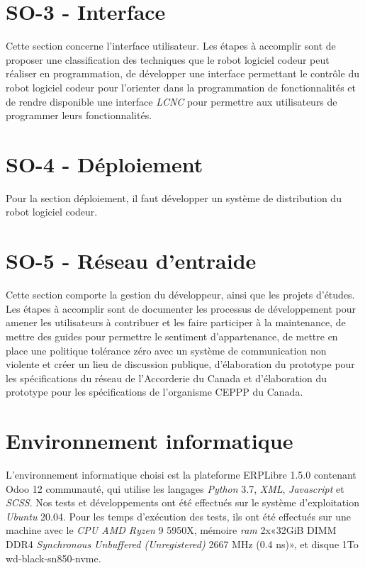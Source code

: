 \section{SO-3 - Interface}
Cette section concerne l'interface utilisateur. Les étapes à accomplir sont de proposer une classification des techniques que le robot logiciel codeur peut réaliser en programmation, de développer une interface permettant le contrôle du robot logiciel codeur pour l’orienter dans la programmation de fonctionnalités et de rendre disponible une interface \textit{LCNC} pour permettre aux utilisateurs de programmer leurs fonctionnalités.

\section{SO-4 - Déploiement}
Pour la section déploiement, il faut développer un système de distribution du robot logiciel codeur.

\section{SO-5 - Réseau d’entraide}
Cette section comporte la gestion du développeur, ainsi que les projets d'études. Les étapes à accomplir sont de documenter les processus de développement pour amener les utilisateurs à contribuer et les faire participer à la maintenance, de mettre des guides pour permettre le sentiment d'appartenance, de mettre en place une politique tolérance zéro avec un système de communication non violente et créer un lieu de discussion publique, d'élaboration du prototype pour les spécifications du réseau de l’Accorderie du Canada et d'élaboration du prototype pour les spécifications de l’organisme CEPPP du Canada.

\section{Environnement informatique}
L'environnement informatique choisi est la plateforme ERPLibre 1.5.0 contenant Odoo 12 communauté, qui utilise les langages \textit{Python} 3.7, \textit{XML}, \textit{Javascript} et \textit{SCSS}. Nos tests et développements ont été effectués sur le système d’exploitation \textit{Ubuntu} 20.04.
Pour les temps d’exécution des tests, ils ont été effectués sur une machine avec le \textit{CPU AMD Ryzen} 9 5950X, mémoire \textit{ram} 2x«32GiB DIMM DDR4 \textit{Synchronous Unbuffered (Unregistered)} 2667 MHz (0.4 ns)», et disque 1To wd-black-sn850-nvme.

